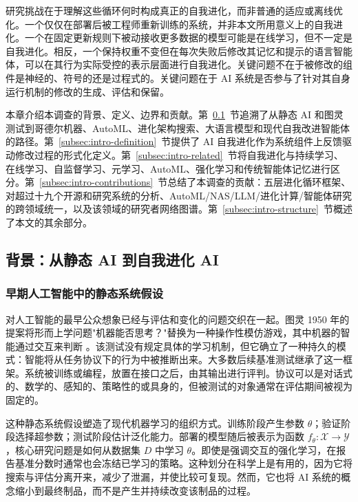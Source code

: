 研究挑战在于理解这些循环何时构成真正的自我进化，而非普通的适应或离线优化。一个仅仅在部署后被工程师重新训练的系统，并非本文所用意义上的自我进化。一个在固定更新规则下被动接收更多数据的模型可能是在线学习，但不一定是自我进化。相反，一个保持权重不变但在每次失败后修改其记忆和提示的语言智能体，可以在其行为实际受控的表示层面进行自我进化。关键问题不在于被修改的组件是神经的、符号的还是过程式的。关键问题在于 AI 系统是否参与了针对其自身运行机制的修改的生成、评估和保留。

本章介绍本调查的背景、定义、边界和贡献。第~\ref{subsec:intro-background}~节追溯了从静态 AI 和图灵测试到哥德尔机器、AutoML、进化架构搜索、大语言模型和现代自我改进智能体的路径。第~\ref{subsec:intro-definition}~节提供了 AI 自我进化作为系统组件上反馈驱动修改过程的形式化定义。第~\ref{subsec:intro-related}~节将自我进化与持续学习、在线学习、自监督学习、元学习、AutoML、强化学习和传统智能体记忆进行区分。第~\ref{subsec:intro-contributions}~节总结了本调查的贡献：五层进化循环框架、对超过十九个开源和研究系统的分析、AutoML/NAS/LLM/进化计算/智能体研究的跨领域统一，以及该领域的研究者网络图谱。第~\ref{subsec:intro-structure}~节概述了本文的其余部分。

\subsection{背景：从静态 AI 到自我进化 AI}
\label{subsec:intro-background}

\subsubsection{早期人工智能中的静态系统假设}

对人工智能的最早公众想象已经与评估和变化的问题交织在一起。图灵 1950 年的提案将形而上学问题"机器能否思考？"替换为一种操作性模仿游戏，其中机器的智能通过交互来判断 \cite{turing1950computing}。该测试没有规定具体的学习机制，但它确立了一种持久的模式：智能将从任务协议下的行为中被推断出来。大多数后续基准测试继承了这一框架。系统被训练或编程，放置在接口之后，由其输出进行评判。协议可以是对话式的、数学的、感知的、策略性的或具身的，但被测试的对象通常在评估期间被视为固定的。

这种静态系统假设塑造了现代机器学习的组织方式。训练阶段产生参数 $\theta$；验证阶段选择超参数；测试阶段估计泛化能力。部署的模型随后被表示为函数 $f_{\theta}:\mathcal{X}\rightarrow\mathcal{Y}$，核心研究问题是如何从数据集 $D$ 中学习 $\theta$。即使是强调交互的强化学习，在报告基准分数时通常也会冻结已学习的策略。这种划分在科学上是有用的，因为它将搜索与评估分离开来，减少了泄漏，并使比较可复现。然而，它也将 AI 系统的概念缩小到最终制品，而不是产生并持续改变该制品的过程。

